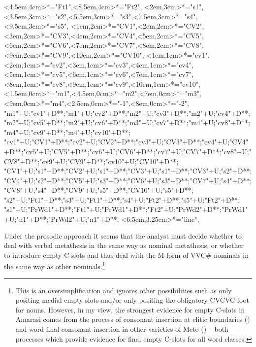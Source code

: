 \begin{multicols}{2}
\begin{exe}
{			<4.5em,4cm>*="Ft1",<8.5em,4cm>*="Ft2",
			<2em,3cm>*="s1",<3.5em,3cm>*="s2",<5.5em,3cm>*="s3",<7.5em,3cm>*="s4",<9.5em,3cm>*="s5",
			<1em,2cm>*="CV1",<2em,2cm>*="CV2",<3em,2cm>*="CV3",<4em,2cm>*="CV4",<5em,2cm>*="CV5",<6em,2cm>*="CV6",<7em,2cm>*="CV7",<8em,2cm>*="CV8",<9em,2cm>*="CV9",<10em,2cm>*="CV10",
			<1em,1cm>*="cv1",<2em,1cm>*="cv2",<3em,1cm>*="cv3",<4em,1cm>*="cv4",<5em,1cm>*="cv5",<6em,1cm>*="cv6",<7em,1cm>*="cv7",<8em,1cm>*="cv8",<9em,1cm>*="cv9",<10em,1cm>*="cv10",
			<1.5em,0cm>*="m1",<4.5em,0cm>*="m2",<7em,0cm>*="m3",<9em,0cm>*="m4",<2.5em,0cm>*\as{-}="-1",<8em,0cm>*\as{-}="-2",
			"m1"+U;"cv1"+D**\dir{-};"m1"+U;"cv2"+D**\dir{-};"m2"+U;"cv3"+D**\dir{-};"m2"+U;"cv4"+D**\dir{-};"m2"+U;"cv5"+D**\dir{-};"m2"+U;"cv6"+D**\dir{-};"m3"+U;"cv7"+D**\dir{-};"m4"+U;"cv8"+D**\dir{-};"m4"+U;"cv9"+D**\dir{-};"m4"+U;"cv10"+D**\dir{-};
			"cv1"+U;"CV1"+D**\dir{-};"cv2"+U;"CV2"+D**\dir{-};"cv3"+U;"CV3"+D**\dir{-};"cv4"+U;"CV4"+D**\dir{-};"cv5"+U;"CV5"+D**\dir{-};"cv6"+U;"CV6"+D**\dir{-};"cv7"+U;"CV7"+D**\dir{-};"cv8"+U;"CV8"+D**\dir{-};"cv9"+U;"CV9"+D**\dir{-};"cv10"+U;"CV10"+D**\dir{-};
			"CV1"+U;"s1"+D**\dir{-};"CV2"+U;"s1"+D**\dir{-};"CV3"+U;"s1"+D**\dir{-};"CV3"+U;"s2"+D**\dir{-};"CV4"+U;"s2"+D**\dir{-};"CV5"+U;"s3"+D**\dir{-};"CV6"+U;"s3"+D**\dir{-};"CV7"+U;"s4"+D**\dir{-};"CV8"+U;"s4"+D**\dir{-};"CV9"+U;"s5"+D**\dir{-};"CV10"+U;"s5"+D**\dir{-};
			"s2"+U;"Ft1"+D**\dir{-};"s3"+U;"Ft1"+D**\dir{-};"s4"+U;"Ft2"+D**\dir{-};"s5"+U;"Ft2"+D**\dir{-};
			"s1"+U;"PrWd1"+D**\dir{-};"Ft1"+U;"PrWd1"+D**\dir{-};"Ft2"+U;"PrWd2"+D**\dir{-};"PrWd1"+U;"n1"+D**\dir{-};"PrWd2"+U;"n1"+D**\dir{-};
			<6.5em,3.25cm>*="line",
		\endxy}\label{as:misoup-main2}
	\end{exe}
\end{multicols}

Under the prosodic approach it seems that
the analyst must decide whether to deal with
verbal metathesis in the same way as nominal metathesis,
or whether to introduce empty C-slots and thus
deal with the M-form of VVC{\#} nominals in the same way as other nominals.\footnote{
		This is an oversimplification and ignores other possibilities
		such as only positing medial empty slots and/or only positing
		the obligatory CVCVC foot for nouns.	
		However, in my view, the strongest evidence for empty C-slots
		in Amarasi comes from the process of consonant insertion
		at clitic boundaries () and	word final
		consonant insertion in other varieties of Meto ()
		-- both processes which provide evidence for final empty C-slots for all word classes.}

